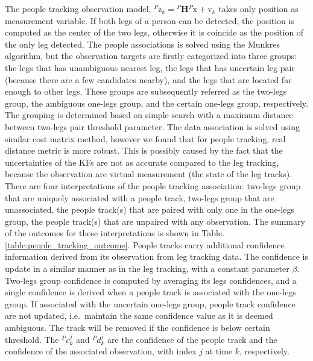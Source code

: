 \documentclass[10 pt,a4paper,conference]{IEEEtran}
\begin{document}
The people tracking observation model,
\({}^P\boldsymbol{\mathrm{z}}_k={}^P\boldsymbol{H}{}^P\boldsymbol{\mathrm{x}}+\boldsymbol{\mathrm{v}}_k\)
takes only position as measurement variable. If both legs of a person
can be detected, the position is computed as the center of the two legs,
otherwise it is coincide as the position of the only leg detected. The
people associations is solved using the Munkres algorithm, but the
observation targets are firstly categorized into three groups: the legs
that has unambiguous nearest leg, the legs that has uncertain leg pair
(because there are a few candidates nearby), and the legs that are
located far enough to other legs. These groups are subsequently referred
as the two-legs group, the ambiguous one-legs group, and the certain
one-legs group, respectively. The grouping is determined based on simple
search with a maximum distance between two-legs pair threshold
parameter. The data association is solved using similar cost matrix
method, however we found that for people tracking, real distance metric
is more robust. This is possibly caused by the fact that the
uncertainties of the KFs are not as accurate compared to the leg
tracking, because the observation are virtual measurement (the state of
the leg tracks). There are four interpretations of the people tracking
association: two-legs group that are uniquely associated with a people
track, two-legs group that are unassociated, the people track(s) that
are paired with only one in the one-legs group, the people track(s) that
are unpaired with any observation. The summary of the outcomes for these
interpretations is shown in Table. \ref{table:people_tracking_outcome}.
People tracks carry additional confidence information derived from its
observation from leg tracking data. The confidence is update in a
similar manner as in the leg tracking, with a constant parameter
\(\beta\). Two-legs group confidence is computed by averaging its legs
confidences, and a single confidence is derived when a people track is
associated with the one-legs group. If associated with the uncertain
one-legs group, people track confidence are not updated, i.e.~maintain
the same confidence value as it is deemed ambiguous. The track will be
removed if the confidence is below certain threshold. The \({}^Pc^j_k\)
and \({}^Pd^j_k\) are the confidence of the people track and the
confidence of the associated observation, with index \(j\) at time
\(k\), respectively.
\end{document}
